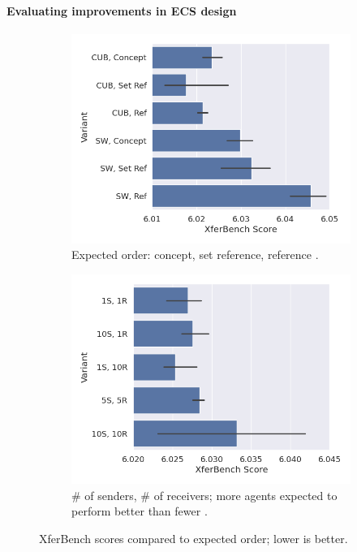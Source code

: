 \paragraph{Evaluating improvements in ECS design}
\begin{figure}
  \centering
  \hfill
  \begin{subfigure}{0.45\linewidth}
    \centering
    \includegraphics[width=\linewidth]{chapters/elcc/src/figure/generated/mu-goodman}
    \caption{Expected order: concept, set reference, reference \citep{mu2021generalizations}.}
  \end{subfigure}
  \hfill
  \begin{subfigure}{0.45\linewidth}
    \centering
    \includegraphics[width=\linewidth]{chapters/elcc/src/figure/generated/ec-at-scale}
    \caption{\# of senders, \# of receivers; more agents expected to perform better than fewer \citep{chaabouni2022emergent}.}
  \end{subfigure}
  \hfill
  \caption{XferBench scores compared to expected order; lower is better.}
  \label{elcc:fig:improvements}
\end{figure}
